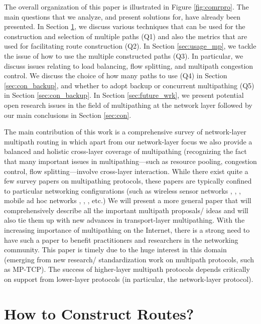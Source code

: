 \documentclass[10pt]{IEEEtran}
\begin{document}
The overall organization of this paper is illustrated in Figure \ref{fig:comrpro}. The main questions that we analyze, and present solutions for, have already been presented. In Section \ref{sec:cons_sel_of_routes}, we discuss various techniques that can be used for the construction and selection of multiple paths (Q1) and also the metrics that are used for facilitating route construction (Q2). In Section \ref{sec:usage_mp}, we tackle the issue of how to use the multiple constructed paths (Q3). In particular, we discuss issues relating to load balancing, flow splitting, and multipath congestion control. We discuss the choice of how many paths to use (Q4) in Section \ref{sec:con_backup}, and whether to adopt backup or concurrent multipathing (Q5) in Section \ref{sec:con_backup}. In Section \ref{sec:future_wrk}, we present potential open research issues in the field of multipathing at the network layer followed by our main conclusions in Section \ref{sec:con}.

The main contribution of this work is a comprehensive survey of network-layer multipath routing in which apart from our network-layer focus we also provide a balanced and holistic cross-layer coverage of multipathing (recognizing the fact that many important issues in multipathing---such as resource pooling, congestion control, flow splitting---involve cross-layer interaction. While there exist quite a few survey papers on multipathing protocols, these papers are typically confined to particular networking configurations (such as wireless sensor networks  \cite{radi2012multipath}, \cite{sha2013multipath}, \cite{tarique2009survey}, mobile ad hoc networks \cite{mueller2004multipath}, \cite{lou2006performance}, \cite{parissidis2006multi}, etc.) We will present a more general paper that will comprehensively describe all the important multipath proposals/ ideas and will also tie them up with new advances in transport-layer multipathing. With the increasing importance of multipathing on the Internet, there is a strong need to have such a paper to benefit practitioners and researchers in the networking community. This paper is timely due to the huge interest in this domain (emerging from new research/ standardization work on multipath protocols, such as MP-TCP). The success of higher-layer multipath protocols depends critically on support from lower-layer protocols (in particular, the network-layer protocol). 
 
\vspace{2mm}
\section{How to Construct Routes?}
\label{sec:cons_sel_of_routes}
\end{document}

